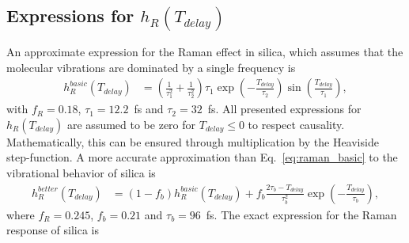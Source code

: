 \subsection{Expressions for $h_R(T_{delay})$}
An approximate expression for the Raman effect in silica, which assumes that the molecular vibrations are dominated by a single frequency is 
\begin{align}
\label{eq:raman_basic}
    h_R^{basic}(T_{delay})&= \left(\frac{1}{\tau_1^{2}}+\frac{1}{\tau_2^{2}} \right)\tau_1\exp\left(-\frac{T_{delay}}{\tau_2}\right)\sin\left(\frac{T_{delay}}{\tau_1}\right),
\end{align}
with $f_R=0.18$, $\tau_1=12.2$~fs and $\tau_2=32$~fs. All presented expressions for $h_R(T_{delay})$ are assumed to be zero for $T_{delay}\leq0$ to respect causality. Mathematically, this can be ensured through multiplication by the Heaviside step-function. A more accurate approximation than Eq.~\ref{eq:raman_basic} to the vibrational behavior of silica is  
\begin{align}
\label{eq:raman_new}
    h_R^{better}(T_{delay})&= (1-f_b) h_R^{basic}(T_{delay})+f_b\frac{2\tau_b-T_{delay}}{\tau_b^2}\exp\left(-\frac{T_{delay}}{\tau_b}\right),
\end{align}
where $f_R=0.245$, $f_b=0.21$ and $\tau_b=96$~fs. The exact expression for the Raman response of silica is


